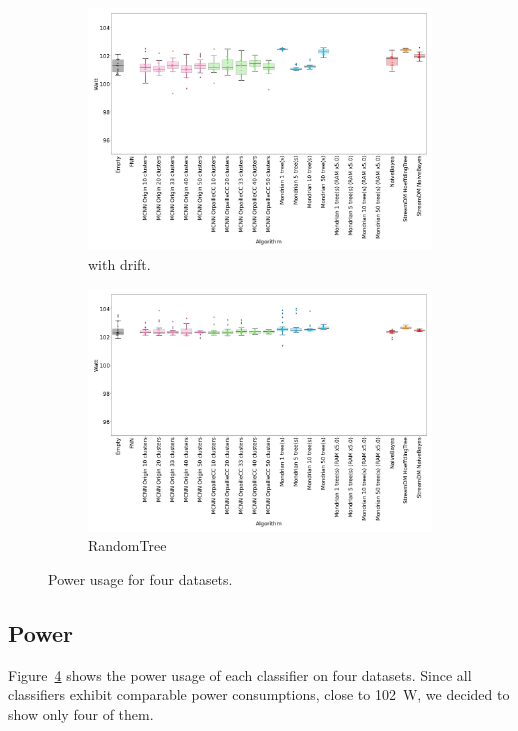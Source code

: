 \begin{figure}
\begin{subfigure}[t]{.49\linewidth}
		\caption{\recofitdataset}
		\label{fig:power-recofit}
	\end{subfigure}\\
	\begin{subfigure}[t]{.49\linewidth}
		\includegraphics[width=\linewidth]{figures/results/drift_3_watt.png}
		\caption{\banosdataset with drift.}
		\label{fig:power-drift}
	\end{subfigure}
	\hfill
	\begin{subfigure}[t]{.49\linewidth}
		\includegraphics[width=\linewidth]{figures/results/dataset_3_watt.png}
		\caption{RandomTree}
		\label{fig:power-dataset_3}
	\end{subfigure}
	\caption{Power usage for four datasets.}
	\label{fig:power}
\end{figure}
\subsection{Power}
\label{sec:result-power}
Figure~\ref{fig:power} shows the power usage of each classifier on four
datasets. Since all classifiers
exhibit comparable power consumptions, close to 102~W, we decided to show only
four of them.



